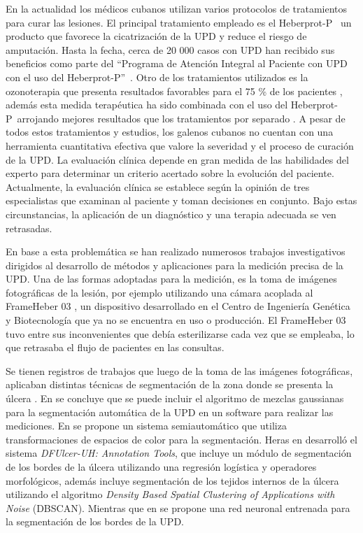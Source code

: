 En la actualidad los médicos cubanos utilizan varios protocolos de tratamientos para curar las lesiones. El principal tratamiento empleado es el Heberprot-P\textregistered~\cite{berlanga2013heberprot} un producto que favorece la cicatrización de la UPD y reduce el riesgo de amputación. Hasta la fecha, cerca de 20 000 casos con UPD han recibido sus beneficios como parte del \textquotedblleft Programa de Atención Integral al Paciente con UPD con el uso del Heberprot-P\textregistered\textquotedblright\  \cite{gonzalez2015resultados}. Otro de los tratamientos utilizados es la ozonoterapia que presenta resultados favorables para el 75 \% de los pacientes \cite{alvarez2014beneficios}, además esta medida terapéutica ha sido combinada con el uso del Heberprot-P\textregistered~arrojando mejores resultados que los tratamientos por separado \cite{martinez2019evolucion}. A pesar de todos estos tratamientos y estudios, los galenos cubanos no cuentan con una herramienta cuantitativa efectiva que valore la severidad y el proceso de curación de la UPD. La evaluación clínica depende en gran medida de las habilidades del experto para determinar un criterio acertado sobre la evolución del paciente. Actualmente, la evaluación clínica se establece según la opinión de tres especialistas que examinan al paciente y toman decisiones en conjunto. Bajo estas circunstancias, la aplicación de un diagnóstico y una terapia adecuada se ven retrasadas.

En base a esta problemática se han realizado numerosos trabajos investigativos dirigidos al desarrollo de métodos y aplicaciones para la medición precisa de la UPD. Una de las formas adoptadas para la medición, es la toma de imágenes fotográficas de la lesión, por ejemplo utilizando una cámara acoplada al FrameHeber 03 \cite{cabal2019quantitative}, un dispositivo desarrollado en el Centro de Ingeniería Genética y Biotecnología que ya no se encuentra en uso o producción. El FrameHeber 03 tuvo entre sus inconvenientes que debía esterilizarse cada vez que se empleaba, lo que retrasaba el flujo de pacientes en las consultas. 

Se tienen registros de trabajos que luego de la toma de las imágenes fotográficas, aplicaban distintas técnicas de segmentación de la zona donde se presenta la úlcera \cite{garcia2019mejoramiento, pena2016segmentacion, heras2022diabetic, ching2022segm3d}. En \cite{garcia2019mejoramiento} se concluye que se puede incluir el algoritmo de mezclas gaussianas para la segmentación automática de la UPD en un software para realizar las mediciones. En \cite{pena2016segmentacion} se propone un sistema semiautomático que utiliza transformaciones de espacios de color para la segmentación. Heras en \cite{heras2022diabetic} desarrolló el sistema \emph{DFUlcer-UH: Annotation Tools}, que incluye un módulo de segmentación de los bordes de la úlcera utilizando una regresión logística y operadores morfológicos, además incluye segmentación de los tejidos internos de la úlcera utilizando el algoritmo \textit{Density Based Spatial Clustering of Applications with Noise} (DBSCAN). Mientras que en \cite{ching2022segm3d} se propone una red neuronal entrenada para la segmentación de los bordes de la UPD.

